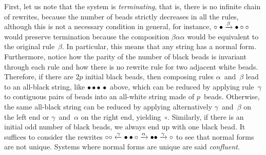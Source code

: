 First, let us note that the system is  
\emph{terminating}, that is, there is no infinite
chain of rewrites, because the number of beads strictly decreases in
all the rules, although this is not a necessary condition in general,
for instance, \(\circ \; \bullet \xrightarrow{\smash{\beta}} \bullet
\circ \circ\) would preserve termination because the composition
\(\beta\alpha\alpha\) would be equivalent to the original
rule~\(\beta\). In particular, this means that any string has a normal
form. Furthermore, notice how the parity of the number of black beads
is invariant through each rule and how there is no rewrite rule for
two adjacent white beads. Therefore, if there are \(2p\) initial black
beads, then composing rules \(\alpha\)~and~\(\beta\) lead to an
all\hyp{}black string, like \(\bullet \bullet \bullet \, \bullet\)
above, which can be reduced by applying rule~\(\gamma\) to contiguous
pairs of beads into an all\hyp{}white string made of
\(p\)~beads. Otherwise, the same all\hyp{}black string can be reduced
by applying alternatively \(\gamma\)~and~\(\beta\) on the left end or
\(\gamma\)~and~\(\alpha\) on the right end,
yielding~\(\circ\). Similarly, if there is an initial odd number of
black beads, we always end up with one black bead. It suffices to
consider the rewrites \(\circ \circ \xleftarrow{\smash{\gamma}}
\bullet \bullet \circ \xrightarrow{\smash{\alpha}} \bullet \bullet
\xrightarrow{\smash{\gamma}} \circ\) to see that normal forms are not
unique. Systems where normal forms are unique are said
\emph{confluent}.

